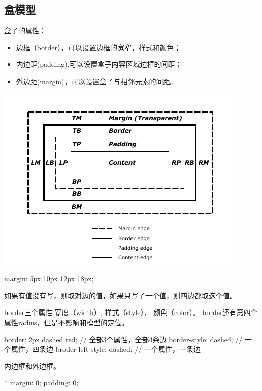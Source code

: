 \subsection{盒模型}

盒子的属性：
\begin{itemize}
\item 边框（border），可以设置边框的宽窄，样式和颜色；
\item 内边距(padding),可以设置盒子内容区域边框的间距；
\item 外边距(margin)，可以设置盒子与相邻元素的间距。
\end{itemize}

\includegraphics[scale=1]{css/resources/box-mode.png}


\begin{CSS}[上 右 下 左]
{margin: 5px 10px 12px 18px;}
\end{CSS}

如果有值没有写，则取对边的值，如果只写了一个值，则四边都取这个值。


border三个属性 宽度（width）, 样式（style）， 颜色（color）。 border还有第四个属性radius，但是不影响和模型的定位。

\begin{CSS}[三个粒度]
{border: 2px dashed red;} // 全部3个属性，全部4条边
{border-style: dashed;} // 一个属性，四条边
{broder-left-style: dashed;} // 一个属性，一条边
\end{CSS}

内边框和外边框。


\begin{CSS}
* {margin: 0; padding: 0;}
\end{CSS}


